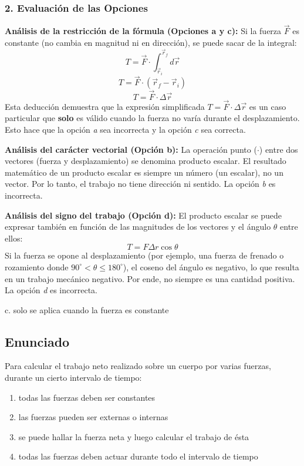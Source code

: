 \documentclass[12pt, a4paper]{article}
\begin{document}
\subsubsection*{2. Evaluación de las Opciones}

\textbf{Análisis de la restricción de la fórmula (Opciones a y c):}
Si la fuerza $\vec{F}$ es constante (no cambia en magnitud ni en dirección), se puede sacar de la integral:
$$T = \vec{F} \cdot \int_{\vec{r}_i}^{\vec{r}_f} d\vec{r}$$
$$T = \vec{F} \cdot (\vec{r}_f - \vec{r}_i)$$
$$T = \vec{F} \cdot \Delta\vec{r}$$
Esta deducción demuestra que la expresión simplificada $T = \vec{F} \cdot \Delta\vec{r}$ es un caso particular que \textbf{solo} es válido cuando la fuerza no varía durante el desplazamiento. Esto hace que la opción \textit{a} sea incorrecta y la opción \textit{c} sea correcta.

\textbf{Análisis del carácter vectorial (Opción b):}
La operación punto ($\cdot$) entre dos vectores (fuerza y desplazamiento) se denomina producto escalar. El resultado matemático de un producto escalar es siempre un número (un escalar), no un vector. Por lo tanto, el trabajo no tiene dirección ni sentido. La opción \textit{b} es incorrecta.

\textbf{Análisis del signo del trabajo (Opción d):}
El producto escalar se puede expresar también en función de las magnitudes de los vectores y el ángulo $\theta$ entre ellos:
$$T = F \Delta r \cos\theta$$
Si la fuerza se opone al desplazamiento (por ejemplo, una fuerza de frenado o rozamiento donde $90^\circ < \theta \leq 180^\circ$), el coseno del ángulo es negativo, lo que resulta en un trabajo mecánico negativo. Por ende, no siempre es una cantidad positiva. La opción \textit{d} es incorrecta.

\begin{tcolorbox}[colback=green!5!white, colframe=green!50!black, title=Respuesta Correcta]
\centering \Large c. solo se aplica cuando la fuerza es constante
\end{tcolorbox}

\newpage

\subsection*{Enunciado}
Para calcular el trabajo neto realizado sobre un cuerpo por varias fuerzas, durante un cierto intervalo de tiempo:
\begin{enumerate}[label=\alph*.]
    \item todas las fuerzas deben ser constantes
    \item las fuerzas pueden ser externas o internas
    \item se puede hallar la fuerza neta y luego calcular el trabajo de ésta
    \item todas las fuerzas deben actuar durante todo el intervalo de tiempo
\end{enumerate}
\end{document}
